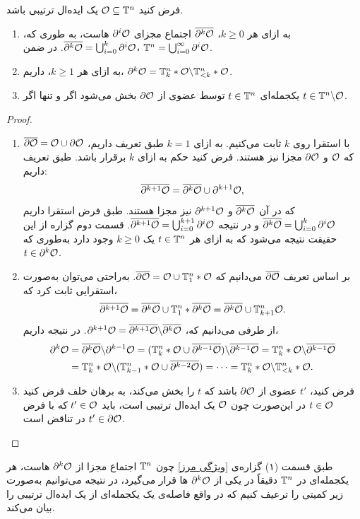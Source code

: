 \begin{proposition}
	\label{ویژگی مرز}
فرض کنید 
${\mathcal O}\subseteq{\mathbb{T}}^{n}$
یک ایده‌ال ترتیبی باشد.
\begin{enumerate}
\item
به ازای هر 
$k\geq 0$،
$\overline{\partial^{k}\mathcal{O}}$
اجتماع مجزای 
$\partial^{i}\mathcal{O}$
هاست، به طوری که،
$\overline{\partial^{k}\mathcal{O}} = \bigcup_{i = 0}^{k}\partial^{i}\mathcal{O}$.
در ضمن، 
${\mathbb{T}}^{n} = \bigcup_{i = 0}^{\infty}\partial^{i}\mathcal{O}$.
\item
به ازای هر 
$k\geq 1$،
داریم، 
$\partial^{k}\mathcal{O} = {\mathbb{T}}^{n}_{k}*{\mathcal O}\backslash {\mathbb{T}}^{n}_{<k}*{\mathcal O}$.
\item
یکجمله‌ای 
$t\in{\mathbb{T}}^{n}$
توسط عضوی از 
$\partial\mathcal{O}$
بخش می‌شود اگر و تنها اگر 
$t\in{\mathbb{T}}^{n}\backslash {\mathcal O}$.
\end{enumerate}
\end{proposition}
\begin{proof}
\begin{enumerate}
\item

با استقرا روی 
$k$
ثابت می‌کنیم. به ازای 
$k = 1$
طبق تعریف داریم،
$\overline{\partial\mathcal{O}} = {\mathcal O} \cup \partial\mathcal{O}$
که 
${\mathcal O}$
و
$\partial\mathcal{O}$
مجزا نیز هستند. فرض کنید حکم به‌ ازای 
$k$
برقرار باشد. طبق تعریف داریم:
$$\overline{\partial^{k+1}\mathcal{O}} = \overline{\partial^{k}\mathcal{O}}\cup\partial^{k+1}\mathcal{O},$$
که در آن 
$\overline{\partial^{k}\mathcal{O}}$
و
$\partial^{k+1}\mathcal{O}$
نیز مجزا هستند. طبق فرض استقرا داریم 
$\overline{\partial^{k}\mathcal{O}} = \bigcup_{i = 0}^{k}\partial^{i}\mathcal{O}$
و در نتیجه 
$\overline{\partial^{k+1}\mathcal{O}} = \bigcup_{i = 0}^{k+1}\partial^{i}\mathcal{O}$.
قسمت دوم گزاره از این حقیقت نتیجه می‌شود که به ازای هر 
$t\in{\mathbb{T}}^{n}$
یک 
$k\geq 0$
وجود دارد به‌طوری که 
$t\in\partial^{k}\mathcal{O}$.
\item
بر اساس تعریف 
$\overline{\partial\mathcal{O}}$
می‌دانیم که 
$\overline{\partial\mathcal{O}} = {\mathcal O} \cup{\mathbb{T}}^{n}_{1}*{\mathcal O}$.
به‌راحتی می‌توان به‌صورت استقرایی ثابت کرد که، 
$$\overline{\partial^{k+1}\mathcal{O}} = \overline{\partial^{k}\mathcal{O}}\cup{\mathbb{T}}^{n}_{1}*\overline{\partial^{k}\mathcal{O}} = \overline{\partial^{k}\mathcal{O}}\cup{\mathbb{T}}^{n}_{k+1}{\mathcal O}.$$
از طرفی می‌دانیم که، 
$\partial^{k+1}\mathcal{O} = \overline{\partial^{k+1}\mathcal{O}}\backslash\overline{\partial^{k}\mathcal{O}}$.
در نتیجه داریم،
\begin{align*}
\partial^{k}\mathcal{O} &= \overline{\partial^{k}\mathcal{O}}\backslash\partial^{k-1}\mathcal{O} = ({\mathbb{T}}^{n}_{k}*{\mathcal O}\cup\overline{\partial^{k-1}\mathcal{O}})\backslash\overline{\partial^{k-1}\mathcal{O}} ={\mathbb{T}}^{n}_{k}*{\mathcal O}\backslash\overline{\partial^{k-1}\mathcal{O}} \\ &={\mathbb{T}}^{n}_{k}*{\mathcal O}\backslash({\mathbb{T}}^{n}_{k-1}*{\mathcal O}\cup\overline{\partial^{k-2}\mathcal{O}}) = \cdots = {\mathbb{T}}^{n}_{k}*{\mathcal O}\backslash{\mathbb{T}}^{n}_{<k}*{\mathcal O}.
\end{align*}
\item
فرض کنید، 
$t'$
عضوی از 
$\partial\mathcal{O}$
باشد که 
$t$
را بخش می‌کند، به برهان خلف فرض کنید 
$t\in{\mathcal O}$
در این‌صورت چون 
${\mathcal O}$
یک ایده‌ال ترتیبی است، باید 
$t'\in{\mathcal O}$
که با فرض 
$t'\in\partial\mathcal{O}$
در تناقض است.
\end{enumerate}
\end{proof}
 طبق قسمت (۱) گزاره‌ی 
 \ref{ویژگی مرز}
چون 
${\mathbb{T}}^{n}$
اجتماع مجزا از 
$\partial^{k}\mathcal{O}$
هاست، هر یکجمله‌ای در 
${\mathbb{T}}^{n}$
دقیقاً در یکی از 
$\partial^{k}\mathcal{O}$
ها قرار می‌گیرد، در نتیجه می‌توانیم به‌صورت زیر کمیتی را ترعیف کنیم که در واقع فاصله‌ی یک یکجمله‌ای از یک ایده‌ال ترتیبی را بیان می‌کند.

